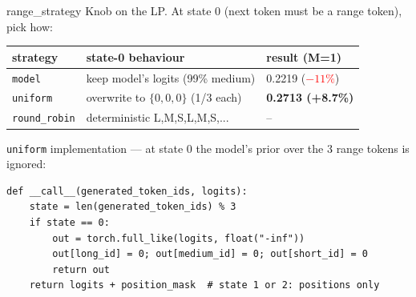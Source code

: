 \documentclass[aspectratio=169,11pt]{beamer}
\newcommand{\code}[1]{\texttt{\small\color{navy}#1}}
\newcommand{\codeS}[1]{\texttt{\scriptsize\color{navy}#1}}
\begin{document}
\begin{frame}[fragile]{\ttfamily range\_strategy} %
  Knob on the LP. At state 0 (next token must be a range token), pick how:
  \vspace{0.5em}
  \begin{center}
  \begin{tabular}{lll}
    \toprule
    strategy & state-0 behaviour & result (M=1)\\
    \midrule
    \code{model} & keep model's logits (99\% medium) & 0.2219 (\textcolor{red}{$-11\%$})\\
    \code{uniform} & overwrite to $\{0, 0, 0\}$ (1/3 each) & \textbf{0.2713 (+8.7\%)}\\
    \code{round\_robin} & deterministic L,M,S,L,M,S,... & --\\
    \bottomrule
  \end{tabular}
  \end{center}
  \vspace{0.6em}
  \codeS{uniform} implementation — at state 0 the model's prior over
  the 3 range tokens is ignored:
  \begin{lstlisting}[style=codesmall]
def __call__(generated_token_ids, logits):
    state = len(generated_token_ids) % 3
    if state == 0:
        out = torch.full_like(logits, float("-inf"))
        out[long_id] = 0; out[medium_id] = 0; out[short_id] = 0
        return out
    return logits + position_mask  # state 1 or 2: positions only
  \end{lstlisting}
\end{frame}
\end{document}
